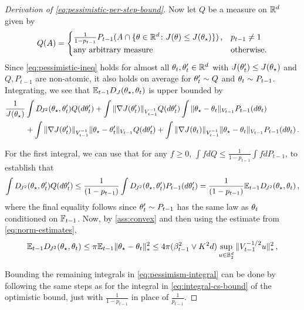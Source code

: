 \begin{proof}[Derivation of \cref{eq:pessimistic-per-step-bound}]
Now let $Q$ be a measure on $\mathbb{R}^d$ given by 
$$
Q(A) = \begin{cases}
  \tfrac{1}{1-p_{t-1}} P_{t-1}(A \cap \{\theta \in \mathbb{R}^d \colon J(\theta) \leq J(\theta_\star)\})\,, & p_{t-1} \neq 1 \\
  \text{any arbitrary measure} & \text{otherwise.} 
\end{cases} 
$$
Since \cref{eq:pessimistic-ineq} holds for almost all $\theta_t,\theta_t' \in \mathbb{R}^d$ with $J(\theta_t') \leq J(\theta_\star)$ and $Q,P_{t-1}$ are non-atomic, it also holds on average for $\theta_t' \sim Q$ and $\theta_t \sim P_{t-1}$. Integrating, we see that $\mathbb{E}_{t-1} D_{J}(\theta_\star, \theta_t)$ is upper bounded by
\begin{align}
  \frac{1}{J(\theta_\star)}& \int D_{\!J^2}(\theta_\star, \theta_t') Q(d\theta_t') + \int \|\nabla J(\theta_t')\|_{V_{t-1}^{-1}} Q(d\theta_t') \int \|\theta_\star - \theta_t\|_{V_{t-1}} P_{t-1}(d\theta_t) \label{eq:pessimism-integral}\\
  &+ \int \|\nabla J(\theta_t')\|_{V_{t-1}^{-1}} \|\theta_\star - \theta_t'\|_{V_{t-1}}  Q(d\theta_t') 
  + \int \|\nabla J(\theta_t)\|_{V_{t-1}^{-1}} \|\theta_\star - \theta_t\|_{V_{t-1}} P_{t-1}(d\theta_t)\,.\nonumber
\end{align}

For the first integral, we can use that for any $f \geq 0$, $\int f dQ \leq \frac{1}{1-p_{t-1}} \int f dP_{t-1}$, to establish that
$$
  \int D_{\!J^2}(\theta_\star, \theta_t') Q(d\theta_t') \leq \frac{1}{(1-p_{t-1})} \int D_{\!J^2}(\theta_\star, \theta_t') P_{t-1}(d\theta_t') = \frac{1}{(1-p_{t-1})}  \mathbb{E}_{t-1} D_{\!J^2}(\theta_\star, \theta_t)\,,
$$
where the final equality follows since $\theta_t' \sim P_{t-1}$ has the same law as $\theta_t$ conditioned on $\mathbb{F}_{t-1}$. Now, by \cref{ass:convex} and then using the estimate from \cref{eq:norm-estimates}, 
$$
  \mathbb{E}_{t-1} D_{\!J^2}(\theta_\star, \theta_t) \leq \pi \mathbb{E}_{t-1} \|\theta_\star - \theta_t\|_{*}^2 \leq 4\pi (\beta_{t-1}^2 \vee K^2 d) \sup_{u \in \mathbb{B}^d_2} \|V_{t-1}^{-1/2}u\|_{*}^2\,,
$$

Bounding the remaining integrals in \cref{eq:pessimism-integral} can be done by following the same steps as for the integral in \cref{eq:integral-cs-bound} of the optimistic bound, just with $\frac{1}{1-p_{t-1}}$ in place of $\frac{1}{p_{t-1}}$. 
\end{proof}